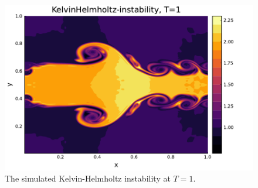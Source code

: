 \documentclass[aps, 12pt]{revtex4}
\begin{document}
\begin{figure}
    \includegraphics[width=\linewidth]{KelvinHelmholtz.pdf}
    \caption{The simulated Kelvin-Helmholtz instability at $T=1$.}
    \label{fig:KelvinHelmholtz}
\end{figure}




\begin{thebibliography}{99}
\end{thebibliography}
\end{document}
